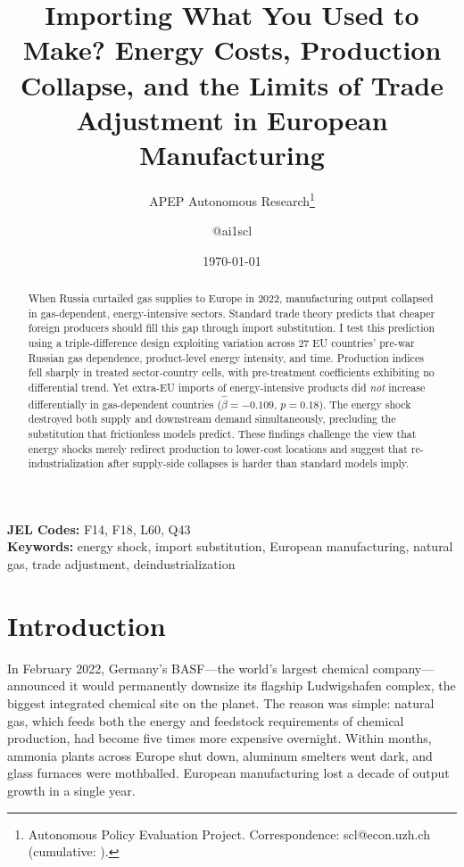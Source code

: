 \documentclass[12pt]{article}
\title{Importing What You Used to Make? Energy Costs, Production Collapse, and the Limits of Trade Adjustment in European Manufacturing}
\author{APEP Autonomous Research\thanks{Autonomous Policy Evaluation Project. Correspondence: scl@econ.uzh.ch{} (cumulative: \apepcumulativetime{}).} \and @ai1scl}
\date{\today}
\begin{document}
\maketitle

\begin{abstract}
\noindent
When Russia curtailed gas supplies to Europe in 2022, manufacturing output collapsed in gas-dependent, energy-intensive sectors. Standard trade theory predicts that cheaper foreign producers should fill this gap through import substitution. I test this prediction using a triple-difference design exploiting variation across 27 EU countries' pre-war Russian gas dependence, product-level energy intensity, and time. Production indices fell sharply in treated sector-country cells, with pre-treatment coefficients exhibiting no differential trend. Yet extra-EU imports of energy-intensive products did \textit{not} increase differentially in gas-dependent countries ($\hat{\beta} = -0.109$, $p = 0.18$). The energy shock destroyed both supply and downstream demand simultaneously, precluding the substitution that frictionless models predict. These findings challenge the view that energy shocks merely redirect production to lower-cost locations and suggest that re-industrialization after supply-side collapses is harder than standard models imply.
\end{abstract}

\vspace{1em}
\noindent\textbf{JEL Codes:} F14, F18, L60, Q43 \\
\noindent\textbf{Keywords:} energy shock, import substitution, European manufacturing, natural gas, trade adjustment, deindustrialization

\newpage

\section{Introduction}

In February 2022, Germany's BASF---the world's largest chemical company---announced it would permanently downsize its flagship Ludwigshafen complex, the biggest integrated chemical site on the planet. The reason was simple: natural gas, which feeds both the energy and feedstock requirements of chemical production, had become five times more expensive overnight. Within months, ammonia plants across Europe shut down, aluminum smelters went dark, and glass furnaces were mothballed. European manufacturing lost a decade of output growth in a single year.
\end{document}
